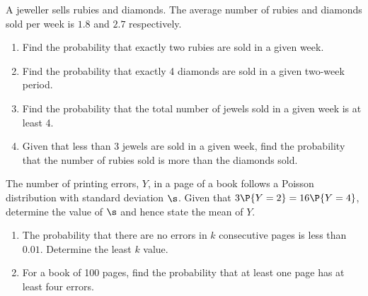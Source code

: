 \begin{problem}
    A jeweller sells rubies and diamonds. The average number of rubies and diamonds sold per week is $1.8$ and $2.7$ respectively.

    \begin{enumerate}
        \item Find the probability that exactly two rubies are sold in a given week.
        \item Find the probability that exactly 4 diamonds are sold in a given two-week period.
        \item Find the probability that the total number of jewels sold in a given week is at least 4.
        \item Given that less than 3 jewels are sold in a given week, find the probability that the number of rubies sold is more than the diamonds sold.
    \end{enumerate}
\end{problem}

\begin{problem}
    The number of printing errors, $Y$, in a page of a book follows a Poisson distribution with standard deviation $\s$. Given that $3\P{Y = 2} = 16\P{Y = 4}$, determine the value of $\s$ and hence state the mean of $Y$.

    \begin{enumerate}
        \item The probability that there are no errors in $k$ consecutive pages is less than $0.01$. Determine the least $k$ value.
        \item For a book of 100 pages, find the probability that at least one page has at least four errors.
    \end{enumerate}
\end{problem}

